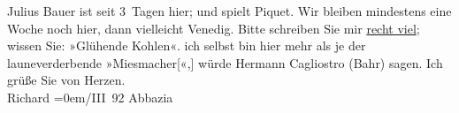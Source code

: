 \begin{ledgroupsized}[t]{13cm}
           \pstart
           Julius Bauer ist seit 3 Tagen hier; und spielt
               Piquet. Wir bleiben mindestens eine Woche noch hier, dann vielleicht Venedig. Bitte schreiben Sie mir \uline{recht viel}; wissen Sie: »Glühende Kohlen«.\pend
           \pstart
           {\pb}ich selbst bin hier mehr als je
               der launeverderbende »Miesmacher{[}«,{]} würde Hermann Cagliostro (Bahr) sagen.\pend
           \pstart
           Ich grüße Sie von Herzen.{\\[\baselineskip]}\spacefill\mbox{Richard}\pend
           \leftskip=0em{}/III 92{ }Abbazia\pend
           
         
         \endnumbering{}\end{ledgroupsized}  \newcommand{\dateiname}{L00078}\newcommand{\titel}{Richard Beer-Hofmann an Arthur Schnitzler, 10. 3. 1892}\newcommand{\editorInnen}{ Martin Anton Müller und Gerd-Hermann Susen}
      